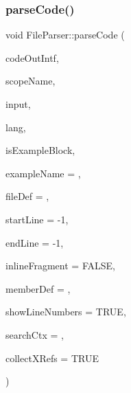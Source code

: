 \subsubsection{\texorpdfstring{parseCode()}{parseCode()}}
{\footnotesize\ttfamily void File\+Parser\+::parse\+Code (\begin{DoxyParamCaption}\item[{\mbox{\hyperlink{class_code_output_interface}{Code\+Output\+Interface}} \&}]{code\+Out\+Intf,  }\item[{const char $\ast$}]{scope\+Name,  }\item[{const \mbox{\hyperlink{class_q_c_string}{Q\+C\+String}} \&}]{input,  }\item[{\mbox{\hyperlink{types_8h_a9974623ce72fc23df5d64426b9178bf2}{Src\+Lang\+Ext}}}]{lang,  }\item[{bool}]{is\+Example\+Block,  }\item[{const char $\ast$}]{example\+Name = {},  }\item[{\mbox{\hyperlink{class_file_def}{File\+Def}} $\ast$}]{file\+Def = {},  }\item[{int}]{start\+Line = {\ttfamily -\/1},  }\item[{int}]{end\+Line = {\ttfamily -\/1},  }\item[{bool}]{inline\+Fragment = {\ttfamily FALSE},  }\item[{\mbox{\hyperlink{class_member_def}{Member\+Def}} $\ast$}]{member\+Def = {},  }\item[{bool}]{show\+Line\+Numbers = {\ttfamily TRUE},  }\item[{\mbox{\hyperlink{class_definition}{Definition}} $\ast$}]{search\+Ctx = {},  }\item[{bool}]{collect\+X\+Refs = {\ttfamily TRUE} }\end{DoxyParamCaption})\hspace{0.3cm}{\ttfamily [virtual]}}


